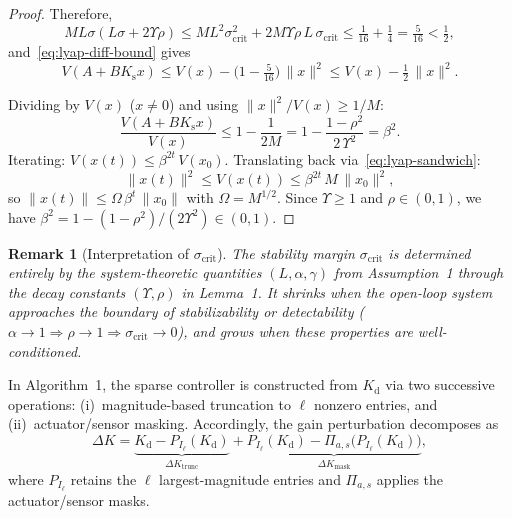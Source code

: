 \documentclass[conference]{IEEEtran}
\newtheorem{remark}{Remark}
\begin{document}
\begin{proof}
Therefore,
\[
  M L \sigma(L\sigma + 2\Upsilon\rho)
  \le M L^{2} \sigma_{\mathrm{crit}}^{2}
      + 2 M \Upsilon\rho\, L\, \sigma_{\mathrm{crit}}
  \le \tfrac{1}{16} + \tfrac{1}{4}
  = \tfrac{5}{16}
  < \tfrac{1}{2},
\]
and~\eqref{eq:lyap-diff-bound} gives
\begin{equation}\label{eq:lyap-half}
  V(A+BK_{\mathrm{s}} x)
  \le V(x) - \bigl(1 - \tfrac{5}{16}\bigr)\,\|x\|^{2}
  \le V(x) - \tfrac{1}{2}\,\|x\|^{2}.
\end{equation}

Dividing by $V(x)$ ($x \ne 0$) and using
$\|x\|^{2}/V(x) \ge 1/M$:
\[
  \frac{V(A+BK_{\mathrm{s}} x)}{V(x)}
  \le 1 - \frac{1}{2M} = 1 - \frac{1-\rho^{2}}{2\,\Upsilon^{2}}
  = \beta^{2}.
\]
Iterating: $V(x(t)) \le \beta^{2t}\,V(x_0)$.
Translating back via~\eqref{eq:lyap-sandwich}:
\[
  \|x(t)\|^{2}
  \le V(x(t))
  \le \beta^{2t}\,M\,\|x_0\|^{2},
\]
so $\|x(t)\| \le \Omega\,\beta^{t}\,\|x_0\|$
with $\Omega = M^{1/2}$.
Since $\Upsilon \ge 1$ and $\rho \in (0,1)$,
we have $\beta^{2} = 1 - (1-\rho^2)/(2\Upsilon^2) \in (0,1)$.
\end{proof}

\begin{remark}[Interpretation of $\sigma_{\mathrm{crit}}$]
\label{rem:sigma-crit}
The stability margin $\sigma_{\mathrm{crit}}$ is determined
entirely by the system-theoretic quantities
$(L, \alpha, \gamma)$ from Assumption~1 through the decay
constants $(\Upsilon, \rho)$ in Lemma~1.
It shrinks when the open-loop system approaches the boundary
of stabilizability or detectability
($\alpha \to 1 \Rightarrow \rho \to 1
  \Rightarrow \sigma_{\mathrm{crit}} \to 0$),
and grows when these properties are well-conditioned.
\end{remark}


In Algorithm~1, the sparse controller is constructed from
$K_{\mathrm{d}}$ via two successive operations:
(i)~magnitude-based truncation to $\ell$ nonzero entries, and
(ii)~actuator/sensor masking.  Accordingly, the gain perturbation
decomposes as
\begin{equation}\label{eq:deltaK-decomp}
  \Delta K = \underbrace{K_{\mathrm{d}}
    - P_{I_{\ell}}(K_{\mathrm{d}})}_{\Delta K_{\mathrm{trunc}}}
  + \underbrace{P_{I_{\ell}}(K_{\mathrm{d}})
    - \Pi_{a,s}\bigl(P_{I_{\ell}}(K_{\mathrm{d}})\bigr)}
    _{\Delta K_{\mathrm{mask}}},
\end{equation}
where $P_{I_\ell}$ retains the $\ell$ largest-magnitude entries
and $\Pi_{a,s}$ applies the actuator/sensor masks.
\end{document}
